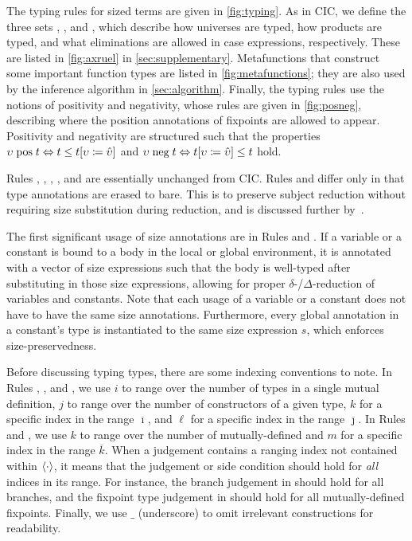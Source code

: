 

The typing rules for sized terms are given in \autoref{fig:typing}. As in CIC, we define the three sets \Axioms, \Rules, and \Elims, which describe how universes are typed, how products are typed, and what eliminations are allowed in case expressions, respectively.
These are listed in \autoref{fig:axruel} in \autoref{sec:supplementary}.
Metafunctions that construct some important function types are listed in \autoref{fig:metafunctions}; they are also used by the inference algorithm in \autoref{sec:algorithm}.
Finally, the typing rules use the notions of positivity and negativity, whose rules are given in \autoref{fig:posneg}, describing where the position annotations of fixpoints are allowed to appear.
Positivity and negativity are structured such that the properties $\upsilon \mathrel{\text{pos}} t \Leftrightarrow t \leq t [\upsilon \coloneqq \hat{\upsilon}]$ and $\upsilon \mathrel{\text{neg}} t \Leftrightarrow t [\upsilon \coloneqq \hat{\upsilon}] \leq t$ hold.



Rules , , ,  , and  are essentially unchanged from CIC.
Rules  and  differ only in that type annotations are erased to bare.
This is to preserve subject reduction without requiring size substitution during reduction, and is discussed further by~\citet{cic-hat-minus}.

The first significant usage of size annotations are in Rules  and .
If a variable or a constant is bound to a body in the local or global environment, it is annotated with a vector of size expressions such that the body is well-typed after substituting in those size expressions, allowing for proper $\delta$-/$\Delta$-reduction of variables and constants.
Note that each usage of a variable or a constant does not have to have the same size annotations.
Furthermore, every global annotation in a constant's type is instantiated to the same size expression $s$, which enforces size-preservedness.

Before discussing typing \coinductive types, there are some indexing conventions to note.
In Rules , , and , we use $i$ to range over the number of \coinductive types in a single mutual \coinductive definition, $j$ to range over the number of constructors of a given \coinductive type, $k$ for a specific index in the range $\overline{\imath}$, and $\ell$ for a specific index in the range $\overline{\jmath}$.
In Rules  and , we use $k$ to range over the number of mutually-defined \cofixpoints and $m$ for a specific index in the range $\overline{k}$.
When a judgement contains a ranging index not contained within $\langle\cdot\rangle$, it means that the judgement or side condition should hold for \textit{all} indices in its range.
For instance, the branch judgement in  should hold for all branches, and the fixpoint type judgement in  should hold for all mutually-defined fixpoints.
Finally, we use $\_$ (underscore) to omit irrelevant constructions for readability.

